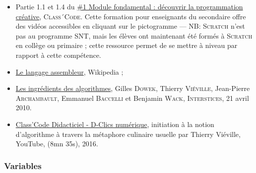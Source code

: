 \begin{gofurther}
\begin{itemize}\jazzitem
	\item Partie 1.1 et 1.4 du \href{https://pixees.fr/classcode/formations/module1/\#partie1}{\#1 Module fondamental : découvrir la programmation créative}, \textsc{Class´Code}. Cette formation pour enseignants du secondaire offre des vidéos accessibles en cliquant sur le pictogramme  --- NB: \textsc{Scratch} n'est pas au programme SNT, mais les élèves ont maintenant été formés à \textsc{Scratch} en collège ou primaire ; cette ressource permet de se mettre à niveau par rapport à cette compétence.
\end{itemize}

\begin{itemize}\jazzitem
\item \href{https://fr.wikipedia.org/wiki/Assembleur}{Le langage assembleur}, Wikipedia ;
\item \href{https://interstices.info/les-ingredients-des-algorithmes/}{Les ingrédients des algorithmes}, Gilles \textsc{Dowek}, Thierry \textsc{Viéville}, Jean-Pierre \textsc{Archambault}, Emmanuel \textsc{Baccelli} et Benjamin \textsc{Wack}, \textsc{Interstices}, 21 avril 2010.
\end{itemize}

\begin{itemize}\jazzitem
\item \href{https://www.youtube.com/watch?v=AWsNFN0GCuQ}{Class'Code Didacticiel - D-Clics numérique}, initiation à la notion d'algorithme à travers la métaphore culinaire usuelle par Thierry Viéville, YouTube, (8mn 35s), 2016.
\end{itemize}
\end{gofurther}

\subsubsection[Variables]{Variables}
\label{subsub:VI.1.1.2}

